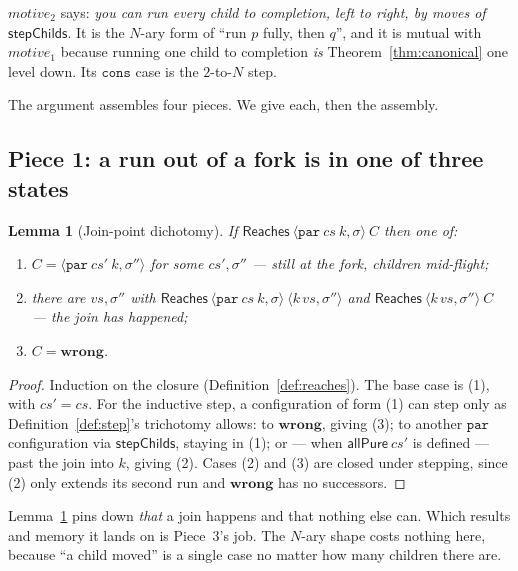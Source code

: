 \documentclass[11pt,a4paper]{article}
\theoremstyle{definition}
\theoremstyle{plain}
\newtheorem{lemma}[definition]{Lemma}
\theoremstyle{remark}
\newcommand{\st}{\sigma}
\newcommand{\Reaches}{\mathsf{Reaches}}
\newcommand{\wrong}{\mathbf{wrong}}
\begin{document}
$\mathit{motive}_2$ says: \emph{you can run every child to completion, left to right, by
moves of $\mathsf{stepChilds}$}. It is the $N$-ary form of ``run $p$ fully, then $q$'', and it
is mutual with $\mathit{motive}_1$ because running one child to completion \emph{is}
Theorem~\ref{thm:canonical} one level down. Its $\texttt{cons}$ case is the $2$-to-$N$ step.

The argument assembles four pieces. We give each, then the assembly.

\subsection{Piece 1: a run out of a fork is in one of three states}

\begin{lemma}[Join-point dichotomy]\label{lem:dichotomy}
If $\Reaches\ \langle \texttt{par}\ cs\ k, \st\rangle\ C$ then one of:
\begin{enumerate}[leftmargin=1.8em,itemsep=1pt]
\item $C = \langle \texttt{par}\ cs'\ k, \st''\rangle$ for some $cs', \st''$ --- still at the fork, children mid-flight;
\item there are $vs, \st''$ with $\Reaches\ \langle \texttt{par}\ cs\ k, \st\rangle\ \langle k\,vs, \st''\rangle$ and $\Reaches\ \langle k\,vs, \st''\rangle\ C$ --- the join has happened;
\item $C = \wrong$.
\end{enumerate}
\end{lemma}

\begin{proof}
Induction on the closure (Definition~\ref{def:reaches}). The base case is (1), with
$cs' = cs$. For the inductive step, a configuration of form (1) can step only as
Definition~\ref{def:step}'s trichotomy allows: to $\wrong$, giving (3); to another
$\texttt{par}$ configuration via $\mathsf{stepChilds}$, staying in (1); or --- when
$\mathsf{allPure}\ cs'$ is defined --- past the join into $k$, giving (2). Cases (2) and (3)
are closed under stepping, since (2) only extends its second run and $\wrong$ has no
successors.
\end{proof}

Lemma~\ref{lem:dichotomy} pins down \emph{that} a join happens and that nothing else can.
Which results and memory it lands on is Piece~3's job. The $N$-ary shape costs nothing here,
because ``a child moved'' is a single case no matter how many children there are.
\end{document}
